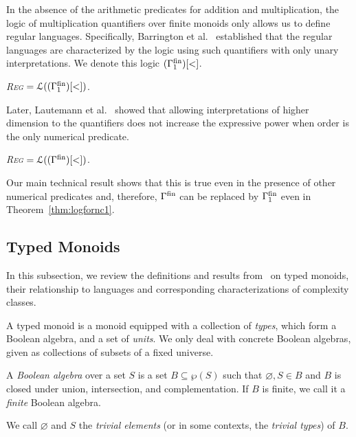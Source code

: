 \documentclass[a4paper,UKenglish,cleveref, autoref, thm-restate, anonymous]{lipics-v2021}
\begin{document}
In the absence of the arithmetic predicates for addition and multiplication, the logic of multiplication quantifiers over finite monoids only allows us to define regular languages.  Specifically, Barrington et al.~\cite{barrington1990uniformity} established that the regular languages are characterized by the logic using such quantifiers with only unary interpretations.
We denote this logic $(\Gamma^{\mathrm{fin}}_1)[<]$.
\begin{theorem}\label{thm:fologforreg}
    \emph{\textsc{Reg}} $= \mathcal{L}((\Gamma^{\mathrm{fin}}_1)[<])$.
\end{theorem}
\noindent Later, Lautemann et al.~\cite[Theorem 5.1]{lautemann2001descriptive} showed that allowing interpretations of higher dimension to the quantifiers does not increase the expressive power when order is the only numerical predicate.
\begin{theorem}\label{thm:unaryfologforreg}
    \emph{\textsc{Reg}} $= \mathcal{L}((\Gamma^{\mathrm{fin}})[<])$.
  \end{theorem}

Our main technical result shows that this is true even in the presence of other numerical predicates and, therefore, $\Gamma^{\mathrm{fin}}$ can be replaced by $\Gamma^{\mathrm{fin}}_1$ even in Theorem~\ref{thm:logfornc1}.  


\subsection{Typed Monoids}\label{sec:backgroundtyped}

In this subsection, we review the definitions and results from~\cite{behle2011typed,krebs2008typed} on typed monoids, their relationship to languages and corresponding characterizations of complexity classes.

A typed monoid is a monoid equipped with a collection of \emph{types}, which form a Boolean algebra, and a set of \emph{units}.  We only deal with concrete Boolean algebras, given as collections of subsets of a fixed universe.

\begin{definition}
    A \emph{Boolean algebra} over a set $S$ is a set $B \subseteq \wp(S)$ such that $\varnothing, S \in B$ and $B$ is closed under union, intersection, and complementation. If $B$ is finite, we call it a \emph{finite} Boolean algebra.

    We call $\varnothing$ and $S$ the \emph{trivial elements} (or in some contexts, the \emph{trivial types}) of $B$.
\end{definition}
\end{document}

